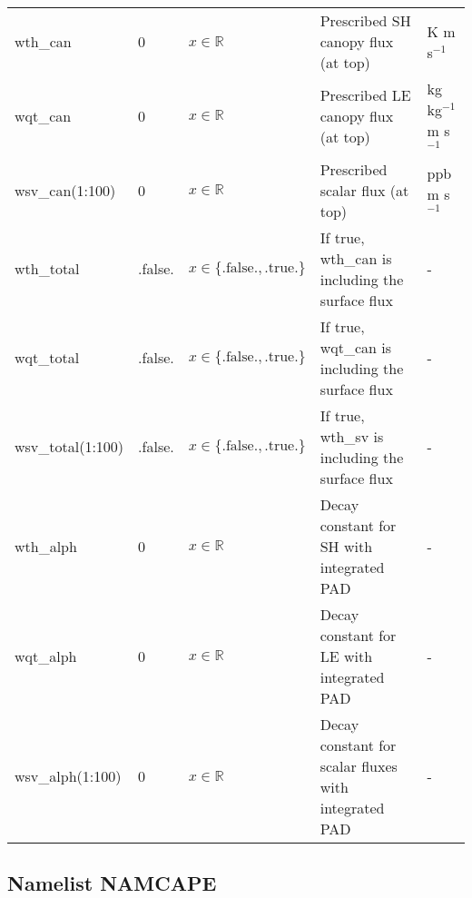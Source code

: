 \documentclass[twoside,11pt,fleqn,a4paper,english,openright]{report}
\begin{document}
\begin{center}
\begin{supertabular}{|l|p{1.5cm}|p{3.5cm}|p{6cm}|l|}
  wth\_can	& 0			& $x \in \mathbb{R}$							& Prescribed SH canopy flux (at top) & K m s$^{-1}$ \\
  wqt\_can	& 0			& $x \in \mathbb{R}$							& Prescribed LE canopy flux (at top) & kg kg$^{-1}$ m s$^{-1}$ \\
  wsv\_can(1:100)	& 0			& $x \in \mathbb{R}$					& Prescribed scalar flux (at top) & ppb m s$^{-1}$ \\
  wth\_total & .false.	& $x\in\{\text{.false.},\text{.true.}\}$		& If true, wth\_can is including the surface flux	& -\\
  wqt\_total & .false.	& $x\in\{\text{.false.},\text{.true.}\}$		& If true, wqt\_can is including the surface flux	& -\\
  wsv\_total(1:100) & .false.	& $x\in\{\text{.false.},\text{.true.}\}$& If true, wth\_sv is including the surface flux	& -\\
  wth\_alph	& 0			& $x \in \mathbb{R}$							& Decay constant for SH with integrated PAD & - \\
  wqt\_alph	& 0			& $x \in \mathbb{R}$							& Decay constant for LE with integrated PAD & - \\
  wsv\_alph(1:100)	& 0			& $x \in \mathbb{R}$					& Decay constant for scalar fluxes with integrated PAD & - \\
\end{supertabular}
\end{center}

\newpage
\subsection{Namelist NAMCAPE}\label{par:cape}
\end{document}
